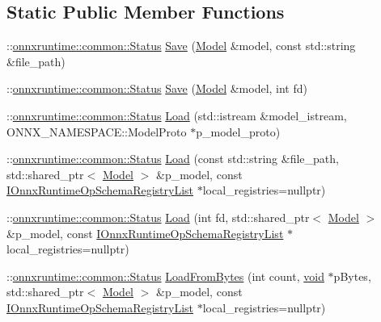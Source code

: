 \subsection*{Static Public Member Functions}
\begin{DoxyCompactItemize}
\item 
\+::\mbox{\hyperlink{classonnxruntime_1_1common_1_1Status}{onnxruntime\+::common\+::\+Status}} \mbox{\hyperlink{classonnxruntime_1_1Model_a9fc3f53be6d48631d4e97add2381abf5}{Save}} (\mbox{\hyperlink{classonnxruntime_1_1Model}{Model}} \&model, const std\+::string \&file\+\_\+path)
\item 
\+::\mbox{\hyperlink{classonnxruntime_1_1common_1_1Status}{onnxruntime\+::common\+::\+Status}} \mbox{\hyperlink{classonnxruntime_1_1Model_a9ce245a1c4fa29450c37a5ffab2743c7}{Save}} (\mbox{\hyperlink{classonnxruntime_1_1Model}{Model}} \&model, int fd)
\item 
\+::\mbox{\hyperlink{classonnxruntime_1_1common_1_1Status}{onnxruntime\+::common\+::\+Status}} \mbox{\hyperlink{classonnxruntime_1_1Model_aee6c392788aa2baf2086f03032b21a3b}{Load}} (std\+::istream \&model\+\_\+istream, O\+N\+N\+X\+\_\+\+N\+A\+M\+E\+S\+P\+A\+C\+E\+::\+Model\+Proto $\ast$p\+\_\+model\+\_\+proto)
\item 
\+::\mbox{\hyperlink{classonnxruntime_1_1common_1_1Status}{onnxruntime\+::common\+::\+Status}} \mbox{\hyperlink{classonnxruntime_1_1Model_a629f04ffae1930227a4dbe3591ff2f98}{Load}} (const std\+::string \&file\+\_\+path, std\+::shared\+\_\+ptr$<$ \mbox{\hyperlink{classonnxruntime_1_1Model}{Model}} $>$ \&p\+\_\+model, const \mbox{\hyperlink{namespaceonnxruntime_a37a91305e7190e83fa9c66117a6a4746}{I\+Onnx\+Runtime\+Op\+Schema\+Registry\+List}} $\ast$local\+\_\+registries=nullptr)
\item 
\+::\mbox{\hyperlink{classonnxruntime_1_1common_1_1Status}{onnxruntime\+::common\+::\+Status}} \mbox{\hyperlink{classonnxruntime_1_1Model_ae2bc651564a923b007c572bee3f7e69d}{Load}} (int fd, std\+::shared\+\_\+ptr$<$ \mbox{\hyperlink{classonnxruntime_1_1Model}{Model}} $>$ \&p\+\_\+model, const \mbox{\hyperlink{namespaceonnxruntime_a37a91305e7190e83fa9c66117a6a4746}{I\+Onnx\+Runtime\+Op\+Schema\+Registry\+List}} $\ast$local\+\_\+registries=nullptr)
\item 
\+::\mbox{\hyperlink{classonnxruntime_1_1common_1_1Status}{onnxruntime\+::common\+::\+Status}} \mbox{\hyperlink{classonnxruntime_1_1Model_a206de3652da23ea5115c292510248da9}{Load\+From\+Bytes}} (int count, \mbox{\hyperlink{mlasi_8h_a88f941d423cb2a819b70a1358982b1a6}{void}} $\ast$p\+Bytes, std\+::shared\+\_\+ptr$<$ \mbox{\hyperlink{classonnxruntime_1_1Model}{Model}} $>$ \&p\+\_\+model, const \mbox{\hyperlink{namespaceonnxruntime_a37a91305e7190e83fa9c66117a6a4746}{I\+Onnx\+Runtime\+Op\+Schema\+Registry\+List}} $\ast$local\+\_\+registries=nullptr)

\end{DoxyCompactItemize}
